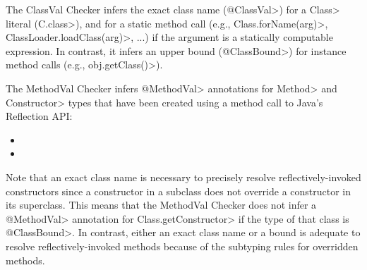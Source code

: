 The ClassVal Checker infers the exact class name (\<@ClassVal>) for a
\<Class> literal (\<C.class>), and for a static method call (e.g.,
\<Class.forName(arg)>, \<ClassLoader.loadClass(arg)>, ...) if the argument is a
statically computable expression.  In contrast, it infers an upper bound
(\<@ClassBound>) for instance method calls (e.g., \<obj.getClass()>).

The MethodVal Checker infers \<@MethodVal> annotations for \<Method> and
\<Constructor> types that have been created using a method call to Java's Reflection
API\@:
\begin{itemize}
    \item {}
    \item {}
\end{itemize}

Note that an exact class name is necessary to precisely resolve
reflectively-invoked constructors since a constructor in a subclass does not
override a constructor in its superclass. This means that the MethodVal Checker
does not infer a \<@MethodVal> annotation for \<Class.getConstructor> if the
type of that class is \<@ClassBound>. In contrast, either an exact class name or a bound
is adequate to resolve reflectively-invoked methods because of the subtyping
rules for overridden methods.


